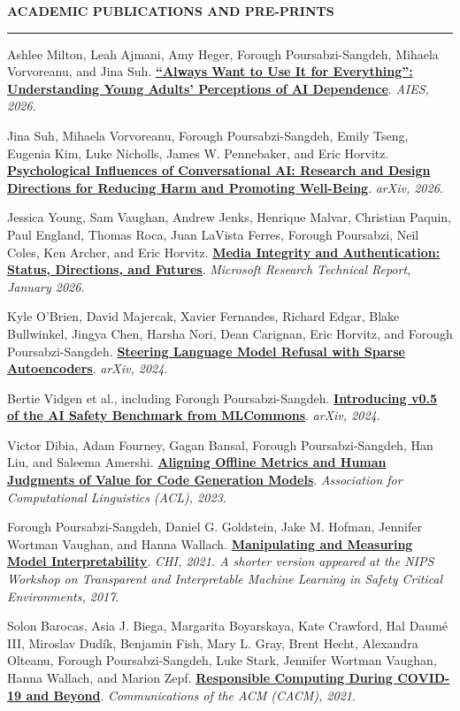 \documentclass[11pt,letterpaper]{article}
\newcommand{\cvsection}[1]{%
  \Needspace{8\baselineskip}%
  \vspace{1.25em}%
  {\large\bfseries\color{navy}\MakeUppercase{#1}}\par
  \vspace{0.16em}%
  {\color{accentblue}\rule{\textwidth}{1.1pt}}\par
  \vspace{0.55em}%
}
\newcommand{\publication}[3]{%
  \Needspace{5\baselineskip}%
  \begingroup
  \setlength{\parindent}{0pt}%
  \setlength{\hangindent}{1.1em}%
  \setlength{\hangafter}{1}%
  #1. \textbf{#2}. \emph{#3}.\par
  \endgroup
  \vspace{0.7em}%
}
\begin{document}
\cvsection{Academic Publications and Pre-prints}

\publication{Ashlee Milton, Leah Ajmani, Amy Heger, Forough Poursabzi-Sangdeh, Mihaela Vorvoreanu, and Jina Suh}
{\href{https://arxiv.org/pdf/2608.07592}{``Always Want to Use It for Everything'': Understanding Young Adults' Perceptions of AI Dependence}}
{AIES, 2026}

\publication{Jina Suh, Mihaela Vorvoreanu, Forough Poursabzi-Sangdeh, Emily Tseng, Eugenia Kim, Luke Nicholls, James W. Pennebaker, and Eric Horvitz}
{\href{https://arxiv.org/pdf/2607.25057}{Psychological Influences of Conversational AI: Research and Design Directions for Reducing Harm and Promoting Well-Being}}
{arXiv, 2026}

\publication{Jessica Young, Sam Vaughan, Andrew Jenks, Henrique Malvar, Christian Paquin, Paul England, Thomas Roca, Juan LaVista Ferres, Forough Poursabzi, Neil Coles, Ken Archer, and Eric Horvitz}
{\href{https://www.microsoft.com/en-us/research/wp-content/uploads/2026/02/Media-Integrity_Authentication-Report_Microsoft_021926.pdf}{Media Integrity and Authentication: Status, Directions, and Futures}}
{Microsoft Research Technical Report, January 2026}

\publication{Kyle O'Brien, David Majercak, Xavier Fernandes, Richard Edgar, Blake Bullwinkel, Jingya Chen, Harsha Nori, Dean Carignan, Eric Horvitz, and Forough Poursabzi-Sangdeh}
{\href{https://arxiv.org/pdf/2411.11296}{Steering Language Model Refusal with Sparse Autoencoders}}
{arXiv, 2024}

\publication{Bertie Vidgen et al., including Forough Poursabzi-Sangdeh}
{\href{https://arxiv.org/pdf/2404.12241}{Introducing v0.5 of the AI Safety Benchmark from MLCommons}}
{arXiv, 2024}

\publication{Victor Dibia, Adam Fourney, Gagan Bansal, Forough Poursabzi-Sangdeh, Han Liu, and Saleema Amershi}
{\href{https://arxiv.org/pdf/2210.16494.pdf}{Aligning Offline Metrics and Human Judgments of Value for Code Generation Models}}
{Association for Computational Linguistics (ACL), 2023}

\publication{Forough Poursabzi-Sangdeh, Daniel G. Goldstein, Jake M. Hofman, Jennifer Wortman Vaughan, and Hanna Wallach}
{\href{https://arxiv.org/pdf/1802.07810.pdf}{Manipulating and Measuring Model Interpretability}}
{CHI, 2021. A shorter version appeared at the NIPS Workshop on Transparent and Interpretable Machine Learning in Safety Critical Environments, 2017}

\publication{Solon Barocas, Asia J. Biega, Margarita Boyarskaya, Kate Crawford, Hal Daum\'e III, Miroslav Dud\'ik, Benjamin Fish, Mary L. Gray, Brent Hecht, Alexandra Olteanu, Forough Poursabzi-Sangdeh, Luke Stark, Jennifer Wortman Vaughan, Hanna Wallach, and Marion Zepf}
{\href{http://users.umiacs.umd.edu/~hal/docs/daume21covid.pdf}{Responsible Computing During COVID-19 and Beyond}}
{Communications of the ACM (CACM), 2021}
\end{document}
